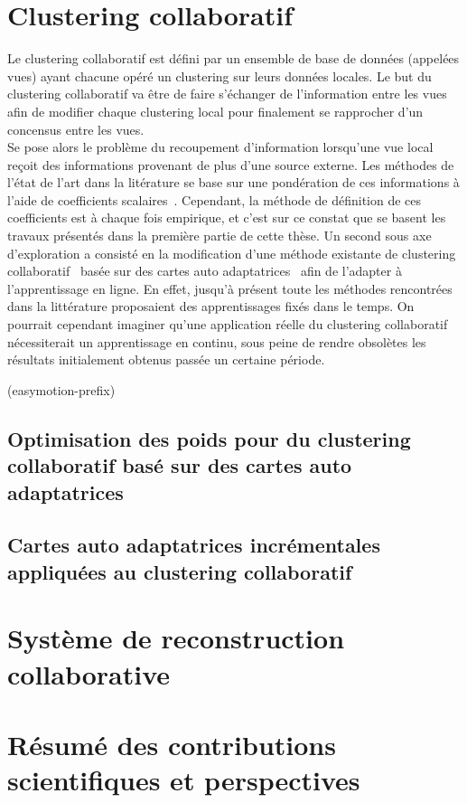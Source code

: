 \section{Clustering collaboratif}


Le clustering collaboratif est défini par un ensemble de base de données (appelées vues) ayant chacune opéré un clustering sur leurs données locales. Le but du clustering collaboratif va \^{e}tre de faire s'échanger de l'information entre les vues afin de modifier chaque clustering local pour finalement se rapprocher d'un concensus entre les vues.\\

Se pose alors le problème du recoupement d'information lorsqu'une vue local reçoit des informations provenant de plus d'une source externe. Les méthodes de l'état de l'art dans la litérature se base sur une pondération de ces informations à l'aide de coefficients scalaires~\cite{cornuejols2018collaborative,pedrycz2002collaborative,maurel2017incremental,ghassany2012collaborative,sublime2016collaborative,rastin2015collaborative}. Cependant, la méthode de définition de ces coefficients est à chaque fois empirique, et c'est sur ce constat que se basent les travaux présentés dans la première partie de cette thèse. Un second sous axe d'exploration a consisté en la modification d'une méthode existante de clustering collaboratif~\cite{ghassany2012collaborative} basée sur des cartes auto adaptatrices~\cite{KOHO1} afin de l'adapter à l'apprentissage en ligne. En effet, jusqu'à présent toute les méthodes rencontrées dans la littérature proposaient des apprentissages fixés dans le temps. On pourrait cependant imaginer qu'une application réelle du clustering collaboratif nécessiterait un apprentissage en continu, sous peine de rendre obsolètes les résultats initialement obtenus passée un certaine période.

(easymotion-prefix)\subsection{Optimisation des poids pour du clustering collaboratif bas\'{e} sur des cartes auto adaptatrices}

\subsection{Cartes auto adaptatrices incr\'{e}mentales appliqu\'{e}es au clustering collaboratif}

\section{Syst\`{e}me de reconstruction collaborative}

\section{R\'{e}sum\'{e} des contributions scientifiques et perspectives}
